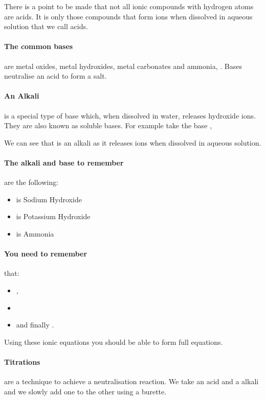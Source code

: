 	There is a point to be made that not all ionic compounds with hydrogen atoms are acids.
	It is only those compounds that form  ions when dissolved in aqueous solution that we call acids.
	
	\paragraph{The common bases} are metal oxides, metal hydroxides, metal carbonates and ammonia, .
	Bases neutralise an acid to form a salt.
	
	\paragraph{An Alkali} is a special type of base which, when dissolved in water, releases hydroxide ions.  They are also known as soluble bases.
	For example take the base ,
	\begin{center}
	\end{center}
	We can see that  is an alkali as it releases  ions when dissolved in aqueous solution.
	
	\paragraph{The alkali and base to remember} are the following:
	\begin{itemize}
		\item {} is Sodium Hydroxide
		\item {} is Potassium Hydroxide
		\item {} is Ammonia
	\end{itemize}
    \paragraph{You need to remember} that:
   \begin{itemize}
\item{}, 
\item   {} 
\item   and finally .
	\end{itemize} 
    Using these ionic equations you should be able to form full equations.
	
	\paragraph{Titrations} are a technique to achieve a neutralisation reaction.
	We take an acid and a alkali and we slowly add one to the other using a burette.
	
